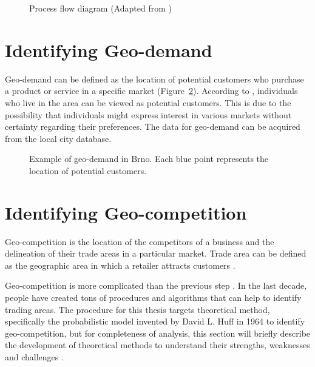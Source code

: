 \newpage

\begin{figure}[ht]
	\centering
	
	\caption{Process flow diagram (Adapted from \cite{roig2013retail})}
	\label{fig:system-diagram}
\end{figure}

\section{Identifying Geo-demand}

Geo-demand can be defined as the location of potential customers who purchase a product or service in a specific market (Figure~\ref{fig:geo-demand}). According to \cite{roig2013retail}, individuals who live in the area can be viewed as potential customers. This is due to the possibility that individuals might express interest in various markets without certainty regarding their preferences. The data for geo-demand can be acquired from the local city database.

\begin{figure}[ht]
	\centering
	
	\caption{Example of geo-demand in Brno. Each blue point represents the location of potential customers.}
	\label{fig:geo-demand}
\end{figure}

\section{Identifying Geo-competition}
\label{sec:identifyingGeocompetition}

Geo-competition is the location of the competitors of a business and the delineation of their trade areas in a particular market. Trade area can be defined as the geographic area in which a retailer attracts customers \cite{baviera2012trade, roig2013retail}.

Geo-competition is more complicated than the previous step \cite{roig2013retail}. In the last decade, people have created tons of procedures and algorithms that can help to identify trading areas. The procedure for this thesis targets theoretical method, specifically the probabilistic model invented by David L. Huff in 1964 to identify geo-competition, but for completeness of analysis, this section will briefly describe the development of theoretical methods to understand their strengths, weaknesses and challenges \cite{roig2013retail}.

